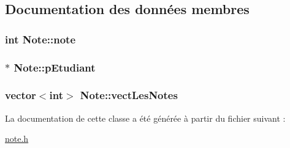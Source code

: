 \subsection{Documentation des données membres}
\hypertarget{class_note_a3cb5f22dd5374f4e3c59c5f11dc7fbfb}{
\subsubsection[{note}]{\setlength{\rightskip}{0pt plus 5cm}int Note\+::note\hspace{0.3cm}{\ttfamily [private]}}}\label{class_note_a3cb5f22dd5374f4e3c59c5f11dc7fbfb}
\hypertarget{class_note_a3ceec90c97d49215fe0eaa33e92a83d2}{
\subsubsection[{p\+Etudiant}]{$\ast$ Note\+::p\+Etudiant\hspace{0.3cm}{\ttfamily [private]}}}\label{class_note_a3ceec90c97d49215fe0eaa33e92a83d2}
\hypertarget{class_note_a1e3b69349068565dc35fcae867145892}{
\subsubsection[{vect\+Les\+Notes}]{\setlength{\rightskip}{0pt plus 5cm}vector$<$int$>$ Note\+::vect\+Les\+Notes\hspace{0.3cm}{\ttfamily [private]}}}\label{class_note_a1e3b69349068565dc35fcae867145892}


La documentation de cette classe a été générée à partir du fichier suivant \+:\begin{DoxyCompactItemize}
\item 
\hyperlink{note_8h}{note.\+h}\end{DoxyCompactItemize}

